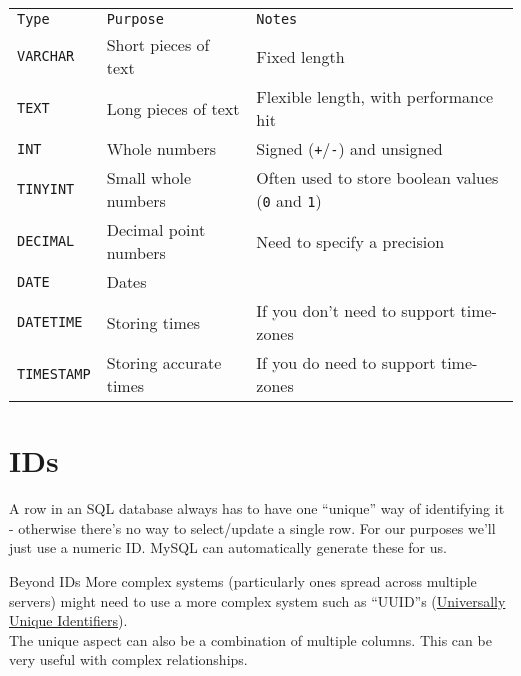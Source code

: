 \begin{small}
    \begin{tabu}{l l X}
        \texttt{Type}       & \texttt{Purpose}       & \texttt{Notes} \\
        \texttt{VARCHAR}    & Short pieces of text   & Fixed length  \\
        \texttt{TEXT}       & Long pieces of text    & Flexible length, with performance hit  \\
        \texttt{INT}        & Whole numbers          & Signed (\texttt{+}/\texttt{-}) and unsigned  \\
        \texttt{TINYINT}    & Small whole numbers    & Often used to store boolean values (\texttt{0} and \texttt{1})  \\
        \texttt{DECIMAL}    & Decimal point numbers  & Need to specify a precision \\
        \texttt{DATE}       & Dates                  &  \\
        \texttt{DATETIME}   & Storing times          & If you don't need to support time-zones \\
        \texttt{TIMESTAMP}  & Storing accurate times & If you do need to support time-zones \\
    \end{tabu}
\end{small}
\par\bigskip


\section{IDs}

A row in an SQL database always has to have one ``unique'' way of identifying it - otherwise there's no way to select/update a single row. For our purposes we'll just use a numeric ID. MySQL can automatically generate these for us.
\\

\begin{infobox}{Beyond IDs}
    More complex systems (particularly ones spread across multiple servers) might need to use a more complex system such as ``UUID''s (\href{https://en.wikipedia.org/wiki/Universally\_unique\_identifier}{Universally Unique Identifiers}).
    \\

    The unique aspect can also be a combination of multiple columns. This can be very useful with complex relationships.
\end{infobox}



